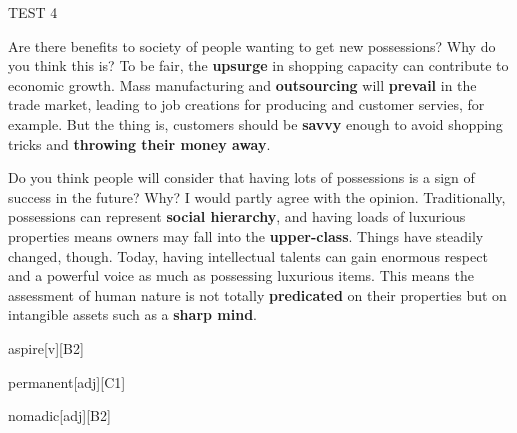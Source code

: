 \begin{glossarymc}[Cambridge 10]
\begin{test}{TEST 4}
    \begin{qa}{Are there benefits to society of people wanting to get new possessions? Why do you think this is?}
    To be fair, the \textbf{upsurge} in shopping capacity can contribute to economic growth. Mass manufacturing and \textbf{outsourcing} will \textbf{prevail} in the trade market, leading to job creations for producing and customer servies, for example. But the thing is, customers should be \textbf{savvy} enough to avoid shopping tricks and \textbf{throwing their money away}.
    \end{qa}

    \begin{qa}{Do you think people will consider that having lots of possessions is a sign of success in the future? Why?}
    I would partly agree with the opinion. Traditionally, possessions can represent \textbf{social hierarchy}, and having loads of luxurious properties means owners may fall into the \textbf{upper-class}. Things have steadily changed, though. Today, having intellectual talents can gain enormous respect and a powerful voice as much as possessing luxurious items. This means the assessment of human nature is not totally \textbf{predicated} on their properties but on intangible assets such as a \textbf{sharp mind}.
    \end{qa}

        \begin{VocabExplain}[Part 3]
            \begin{ExplainCard}{aspire}[v][B2]
            \end{ExplainCard}

            \begin{ExplainCard}{permanent}[adj][C1]
            \end{ExplainCard}

            \begin{ExplainCard}{nomadic}[adj][B2]
            \end{ExplainCard}


\end{VocabExplain}
\end{test}
\end{glossarymc}

